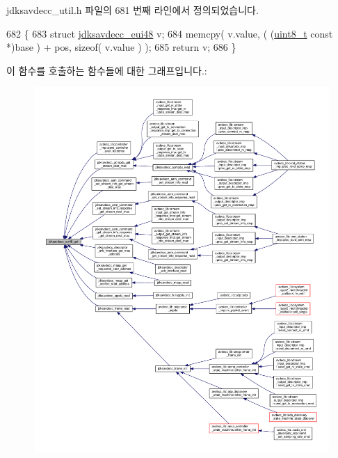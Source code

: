 jdksavdecc\+\_\+util.\+h 파일의 681 번째 라인에서 정의되었습니다.


\begin{DoxyCode}
682 \{
683     \textcolor{keyword}{struct }\hyperlink{structjdksavdecc__eui48}{jdksavdecc\_eui48} v;
684     memcpy( v.value, ( (\hyperlink{stdint_8h_aba7bc1797add20fe3efdf37ced1182c5}{uint8\_t} \textcolor{keyword}{const} *)base ) + pos, \textcolor{keyword}{sizeof}( v.value ) );
685     \textcolor{keywordflow}{return} v;
686 \}
\end{DoxyCode}


이 함수를 호출하는 함수들에 대한 그래프입니다.\+:
\nopagebreak
\begin{figure}[H]
\begin{center}
\leavevmode
\includegraphics[width=350pt]{group__eui48_ga7b4c95f03a90bdf416e9d0833ac08a86_icgraph}
\end{center}
\end{figure}


